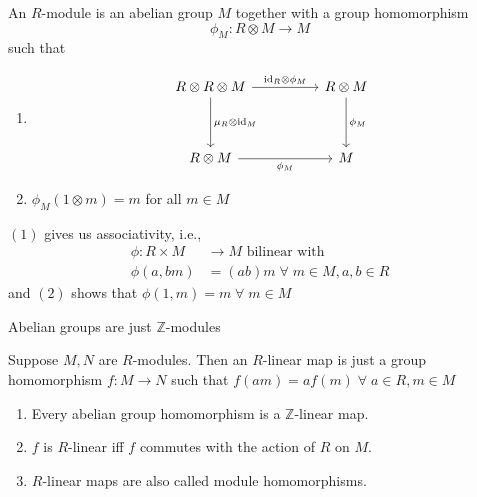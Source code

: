 \documentclass[oneside, 12pt]{scrbook}
\newcommand{\ZZ}{\mathbb Z}
\theoremstyle{theorem}
\begin{document}
\begin{definition}
An $R$-module is an abelian group $M$ together with a group homomorphism 
\begin{equation}
\phi_{M} : R \otimes M \longrightarrow M
\end{equation}
 such that 
 \begin{enumerate}
 \item \[\begin{tikzcd}
	{R \otimes R \otimes M} && {R\otimes M} \\
	\\
	{R\otimes M} && M
	\arrow["{\mu_{R} \otimes \mathrm{id}_{M}}", from=1-1, to=3-1]
	\arrow["{\mathrm{id}_{R}\otimes \phi_{M}}", from=1-1, to=1-3]
	\arrow["{\phi_{M}}", from=1-3, to=3-3]
	\arrow["{\phi_{M}}"', from=3-1, to=3-3]
\end{tikzcd}\]
 
 \item $\phi_{M}(1 \otimes m) = m$ for all $m \in M$
 \end{enumerate}
\end{definition}


\begin{remark}
$(1)$ gives us associativity, i.e., 
\begin{eqnarray*}
\phi: R \times M &\longrightarrow M \text{ bilinear with } \\
\phi(a, bm) &= (ab)m \; \forall \; m \in M , a,b \in R
\end{eqnarray*}
and $(2)$ shows that $\phi(1,m) = m \; \forall \; m \in M$
\end{remark}


\begin{remark}
Abelian groups are just $\ZZ$-modules
\end{remark}

Suppose $M,N$ are $R$-modules. Then an $R$-linear map is just a group homomorphism $f: M \longrightarrow N$ such that $f(am) = af(m) \; \forall \; a\in R , m \in M$

\begin{remark}
\begin{enumerate}
\item Every abelian group homomorphism is a $\ZZ$-linear map. 
\item $f$ is $R$-linear iff $f$ commutes with the action of $R$ on $M$. 
\item $R$-linear maps are also called module homomorphisms.
\end{enumerate}
\end{remark}
\end{document}
